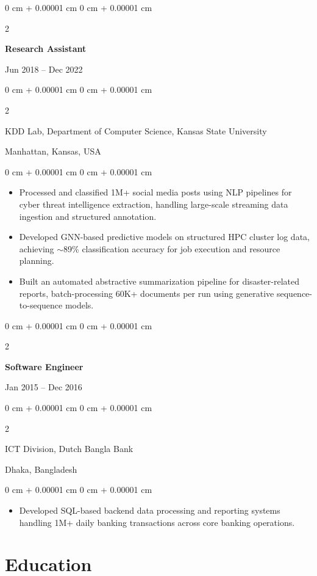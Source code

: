 \documentclass[10pt, letterpaper]{article}
\newenvironment{highlights}{
    \begin{itemize}[
        topsep=0.10 cm,
        parsep=0.10 cm,
        partopsep=0pt,
        itemsep=0pt,
        leftmargin=0 cm + 10pt
    ]
}{
    \end{itemize}
} %
\newenvironment{onecolentry}{
    \begin{adjustwidth}{
        0 cm + 0.00001 cm
    }{
        0 cm + 0.00001 cm
    }
}{
    \end{adjustwidth}
} %
\newenvironment{twocolentry}[2][]{
    \onecolentry
    \def\secondColumn{#2}
    \setcolumnwidth{\fill, 4.5 cm}
    \begin{paracol}{2}
}{
    \switchcolumn \raggedleft \secondColumn
    \end{paracol}
    \endonecolentry
} %
\begin{document}
    \vspace{1mm}

    \begin{twocolentry}{Jun 2018 -- Dec 2022}
        \textbf{Research Assistant}
    \end{twocolentry}
    \begin{twocolentry}{Manhattan, Kansas, USA}
       KDD Lab, Department of Computer Science, Kansas State University
    \end{twocolentry}
    \vspace{0.10 cm}
    \begin{onecolentry}
        \begin{highlights}
            \item Processed and classified 1M+ social media posts using NLP pipelines for cyber threat intelligence extraction, handling large-scale streaming data ingestion and structured annotation.
            \item Developed GNN-based predictive models on structured HPC cluster log data, achieving $\sim$89\% classification accuracy for job execution and resource planning.
            \item Built an automated abstractive summarization pipeline for disaster-related reports, batch-processing 60K+ documents per run using generative sequence-to-sequence models.
        \end{highlights}
    \end{onecolentry}

    \vspace{0.1 cm}
    \begin{twocolentry}{Jan 2015 -- Dec 2016}
        \textbf{Software Engineer}
    \end{twocolentry}
    \begin{twocolentry}{Dhaka, Bangladesh}
       ICT Division, Dutch Bangla Bank
    \end{twocolentry}

    \begin{onecolentry}
        \begin{highlights}
            \item Developed SQL-based backend data processing and reporting systems handling 1M+ daily banking transactions across core banking operations.
        \end{highlights}
    \end{onecolentry}

\section{Education}
\end{document}
